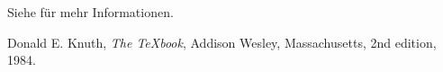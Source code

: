 \documentclass[12pt,ngerman]{scrartcl}
\begin{document}
Siehe \cite{knuth} für mehr Informationen.


\begin{thebibliography}{9}
  Donald E. Knuth,
  \textit{The \TeX book},
  Addison Wesley, Massachusetts,
  2nd edition,
  1984.
\end{thebibliography}
\end{document}

